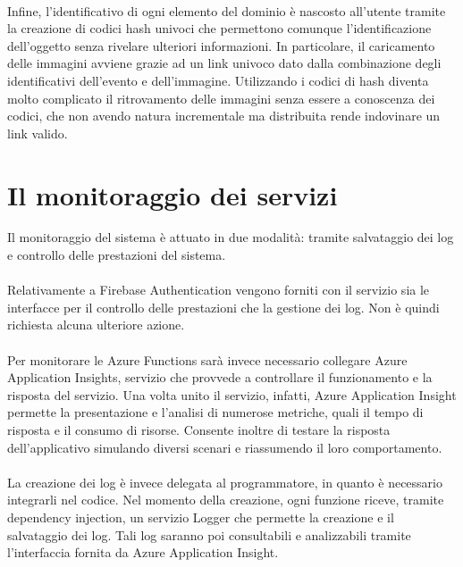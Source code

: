 \\
Infine, l’identificativo di ogni elemento del dominio è nascosto all’utente tramite la creazione di codici hash univoci 
che permettono comunque l’identificazione dell’oggetto senza rivelare ulteriori informazioni. 
In particolare, il caricamento delle immagini avviene grazie ad un link univoco dato dalla combinazione degli identificativi dell’evento e dell’immagine. 
Utilizzando i codici di hash diventa molto complicato il ritrovamento delle immagini senza essere a conoscenza dei codici, 
che non avendo natura incrementale ma distribuita rende indovinare un link valido.


\section{Il monitoraggio dei servizi}

Il monitoraggio del sistema è attuato in due modalità: tramite salvataggio dei log e controllo delle prestazioni del sistema.\\
\\
Relativamente a Firebase Authentication vengono forniti con il servizio sia le interfacce
per il controllo delle prestazioni che la gestione dei log. Non è quindi richiesta alcuna ulteriore azione.\\
\\
Per monitorare le Azure Functions sarà invece necessario collegare Azure Application Insights, servizio che provvede a controllare il funzionamento e la risposta del servizio. 
Una volta unito il servizio, infatti, Azure Application Insight permette la presentazione e l'analisi di numerose metriche, quali il tempo di risposta e il consumo di risorse. 
Consente inoltre di testare la risposta dell’applicativo simulando diversi scenari e riassumendo il loro comportamento.\\
\\
La creazione dei log è invece delegata al programmatore, in quanto è necessario integrarli nel codice. 
Nel momento della creazione, ogni funzione riceve, tramite dependency injection, un servizio Logger che permette la creazione e il salvataggio dei log. 
Tali log saranno poi consultabili e analizzabili tramite l’interfaccia fornita da Azure Application Insight.\\
\\
\clearpage